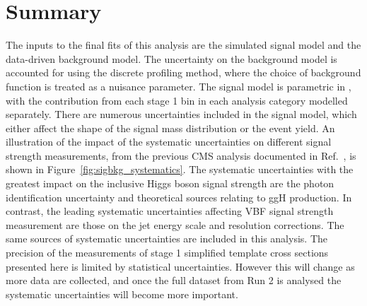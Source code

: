 \section{Summary}

The inputs to the final fits of this analysis are the simulated signal model 
and the data-driven background model.
The uncertainty on the background model is accounted for using the discrete profiling method, 
where the choice of background function is treated as a nuisance parameter.
The signal model is parametric in \mH, 
with the contribution from each stage 1 bin in each analysis category modelled separately.
There are numerous uncertainties included in the signal model, 
which either affect the shape of the signal mass distribution 
or the event yield.
An illustration of the impact of the systematic uncertainties 
on different signal strength measurements, 
from the previous CMS \Hgg analysis documented in Ref.~\cite{HIG-16-040}, 
is shown in Figure~\ref{fig:sigbkg_systematics}.
The systematic uncertainties with the greatest impact on the inclusive Higgs boson signal strength
are the photon identification uncertainty and theoretical sources relating to ggH production.
In contrast, the leading systematic uncertainties affecting VBF signal strength measurement 
are those on the jet energy scale and resolution corrections.
The same sources of systematic uncertainties are included in this analysis.
The precision of the measurements of stage 1 simplified template cross sections presented here
is limited by statistical uncertainties.
However this will change as more data are collected, 
and once the full dataset from Run 2 is analysed 
the systematic uncertainties will become more important.

